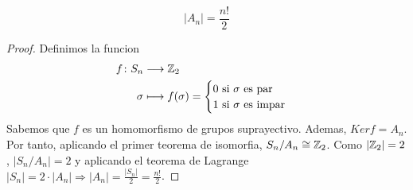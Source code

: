 \begin{corollary}
	\[
		|A_n| = \frac{n! }{2 }
	\]
\end{corollary}
\begin{proof}
	Definimos la funcion
	\[
		\begin{aligned}
			f \colon S_n & \longrightarrow \mathbb{Z}_2                                             \\
			\sigma       & \longmapsto f (\sigma ) = \begin{cases}
				                                         0 \text{ si } \sigma \text{ es par} \\
				                                         1 \text{ si } \sigma \text{ es impar}
			                                         \end{cases}
		\end{aligned}
	\]
	Sabemos que \(f \) es un homomorfismo de grupos suprayectivo. Ademas, \(Kerf = A_n \). Por tanto, aplicando el primer teorema de isomorfia, \(S_n / A_n \cong \mathbb{Z}_2 \). Como \(|\mathbb{Z}_2| = 2\), \(|S_n / A_n| = 2 \) y aplicando el teorema de Lagrange \(|S_n | = 2 \cdot |A_n| \Rightarrow |A_n| = \frac{|S_n| }{2} = \frac{n! }{2}\).
\end{proof}


